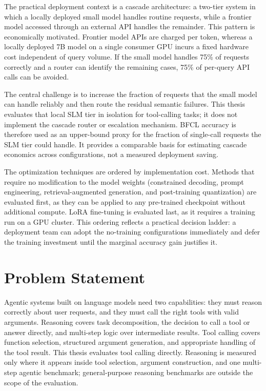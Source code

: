 The practical deployment context is a cascade architecture: a two-tier system in
which a locally deployed small model handles routine requests, while a frontier
model accessed through an external API handles the remainder. This pattern is
economically motivated. Frontier model APIs are charged per token, whereas a
locally deployed 7B model on a single consumer GPU incurs a fixed hardware cost
independent of query volume. If the small model handles 75\% of requests
correctly and a router can identify the remaining cases, 75\% of per-query API
calls can be avoided.

The central challenge is to increase the fraction of requests that the small
model can handle reliably and then route the residual semantic failures. This
thesis evaluates that local SLM tier in isolation for tool-calling tasks; it
does not implement the cascade router or escalation mechanism. BFCL accuracy is
therefore used as an upper-bound proxy for the fraction of single-call requests
the SLM tier could handle. It provides a comparable basis for estimating
cascade economics across configurations, not a measured deployment saving.

The optimization techniques are ordered by implementation cost. Methods
that require no modification to the model weights (constrained
decoding, prompt engineering, retrieval-augmented generation, and
post-training quantization) are evaluated first, as they can be
applied to any pre-trained checkpoint without additional compute.
LoRA fine-tuning is evaluated last, as it requires a training run on a
GPU cluster. This ordering reflects a practical decision ladder: a
deployment team can adopt the no-training configurations immediately
and defer the training investment until the marginal accuracy gain
justifies it.

\section{Problem Statement}

Agentic systems built on language models need two capabilities: they must reason correctly about user requests, and they must call the right tools with valid arguments. Reasoning covers task decomposition, the decision to call a tool or answer directly, and multi-step logic over intermediate results. Tool calling covers function selection, structured argument generation, and appropriate handling of the tool result. This thesis evaluates tool calling directly. Reasoning is measured only where it appears inside tool selection, argument construction, and one multi-step agentic benchmark; general-purpose reasoning benchmarks are outside the scope of the evaluation.

